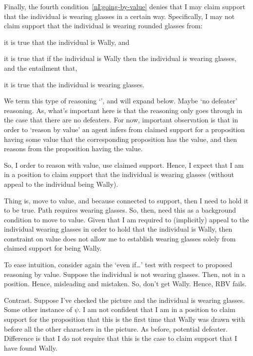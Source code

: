 \begin{note}[Illustration]
  Finally, the fourth condition~\ref{nI:going-by-value} denies that I may claim support that the individual is wearing glasses in a certain way.
  Specifically, I may not claim support that the individual is wearing rounded glasses from:
  \begin{enumerate*}
  \item it is true that the individual is Wally, and
  \item it is true that if the individual is Wally then the individual is wearing glasses, and the entailment that,
  \item it is true that the individual is wearing glasses.
  \end{enumerate*}
  We term this type of reasoning `\RBV{-}', and will expand below.
  {
    \color{red} Maybe `no defeater' reasoning.
    As, what's important here is that the reasoning only goes through in the case that there are no defeaters.
  }
  For now, important observation is that in order to `reason by value' an agent infers from claimed support for a proposition having some value that the corresponding proposition has the value, and then reasons from the proposition having the value.

  So, I order to reason with value, use claimed support.
  Hence, I expect that I am in a position to claim support that the individual is wearing glasses (without appeal to the individual being Wally).

  Thing is, move to value, and because connected to support, then I need to hold it to be true.
  Path requires wearing glasses.
  So, then, need this as a background condition to move to value.
  Given that I am required to (implicitly) appeal to the individual wearing glasses in order to hold that the individual is Wally, then constraint on value does not allow me to establish wearing glasses solely from claimed support for being Wally.

  To ease intuition, consider again the `even if\dots' test with respect to proposed reasoning by value.
  Suppose the individual is not wearing glasses.
  Then, not in a position.
  Hence, misleading and mistaken.
  So, don't get Wally.
  Hence, RBV fails.

  Contrast.
  Suppose I've checked the picture and the individual is wearing glasses.
  Some other instance of \(\psi\).
  I am not confident that I am in a position to claim support for the proposition that this is the first time that Wally was drawn with before all the other characters in the picture.
  As before, potential defeater.
  Difference is that I do not require that this is the case to claim support that I have found Wally.
\end{note}

